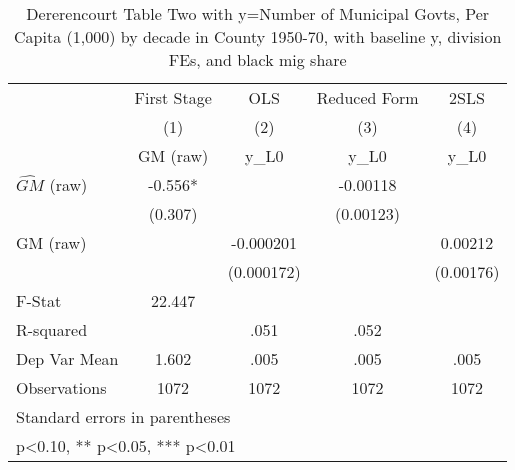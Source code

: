 \begin{table}[htbp]\centering
\def\sym#1{\ifmmode^{#1}\else\(^{#1}\)\fi}
\caption{Dererencourt Table Two with y=Number of Municipal Govts, Per Capita (1,000) by decade in County 1950-70, with baseline y, division FEs, and black mig share}
\begin{tabular}{l*{4}{c}}
\toprule
                    & First Stage   &         OLS   &Reduced Form   &        2SLS   \\
                    &\multicolumn{1}{c}{(1)}&\multicolumn{1}{c}{(2)}&\multicolumn{1}{c}{(3)}&\multicolumn{1}{c}{(4)}\\
                    &\multicolumn{1}{c}{GM  (raw)}&\multicolumn{1}{c}{y\_L0}&\multicolumn{1}{c}{y\_L0}&\multicolumn{1}{c}{y\_L0}\\
\midrule
$\hat{GM}$ (raw)    &      -0.556*  &               &    -0.00118   &               \\
                    &     (0.307)   &               &   (0.00123)   &               \\
\addlinespace
GM  (raw)           &               &   -0.000201   &               &     0.00212   \\
                    &               &  (0.000172)   &               &   (0.00176)   \\
\midrule
F-Stat              &      22.447   &               &               &               \\
R-squared           &               &        .051   &        .052   &               \\
Dep Var Mean        &       1.602   &        .005   &        .005   &        .005   \\
Observations        &        1072   &        1072   &        1072   &        1072   \\
\bottomrule
\multicolumn{5}{l}{\footnotesize Standard errors in parentheses}\\
\multicolumn{5}{l}{\footnotesize * p<0.10, ** p<0.05, *** p<0.01}\\
\end{tabular}
\end{table}
